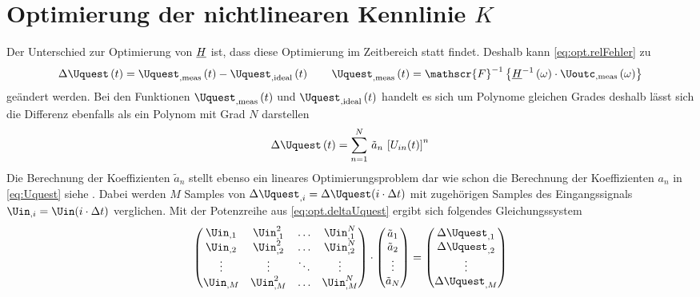 \documentclass[../Report.tex]{subfiles}
\begin{document}
\section{Optimierung der nichtlinearen Kennlinie $K$}
\label{sec:opt.K}
Der Unterschied zur Optimierung von $\underline{H}$ ist, dass diese Optimierung im Zeitbereich statt findet. Deshalb kann \eqref{eq:opt.relFehler} zu
\begin{align}
	\label{eq:opt.deltaUquest}
	\Delta \Uquest \oft = \Uquest_{, \mathrm{meas}} \oft - \Uquest_{, \mathrm{ideal}} \oft
	\qquad
	\Uquest_{, \mathrm{meas}} \oft = \mathscr{F}^{-1} \left\{ \Hcompl^{-1} \ofomega \cdot \Uoutc_{, \mathrm{meas}} \ofomega \right\}
\end{align}
geändert werden. Bei den Funktionen $\Uquest_{, \mathrm{meas}} \oft$ und $\Uquest_{, \mathrm{ideal}} \oft$ handelt es sich um Polynome gleichen Grades deshalb lässt sich die Differenz ebenfalls als ein Polynom mit Grad $N$ darstellen
\begin{align}
	\Delta \Uquest \oft = \sum_{n=1}^N \, \tilde{a}_n \, \left[ U_{in}(t) \right]^n	
\end{align}
Die Berechnung der Koeffizienten $\tilde{a}_n$ stellt ebenso ein lineares Optimierungsproblem dar wie schon die Berechnung der Koeffizienten $a_n$ in \eqref{eq:Uquest} siehe \cite{harzheim}. Dabei werden $M$ Samples von ${\Delta \Uquest_{,i} = \Delta \Uquest (i \cdot \Delta t)}$ mit zugehörigen Samples des Eingangssignals ${\Uin_{,i} = \Uin (i \cdot \Delta t)}$ verglichen. Mit der Potenzreihe aus  \eqref{eq:opt.deltaUquest} ergibt sich folgendes Gleichungssystem
\begin{align}
	\left( 
	\begin{matrix}
	 	\Uin_{,1} & \Uin_{,1}^2 & \dots & \Uin_{,1}^N \\
		\Uin_{,2} & \Uin_{,2}^2 & \dots & \Uin_{,2}^N \\
		\vdots & \vdots & \ddots & \vdots \\
		\Uin_{,M} & \Uin_{,M}^2 & \dots & \Uin_{,M}^N \\
	\end{matrix}
	\right)
	\cdot
	\left(
	\begin{matrix}
		\tilde{a}_1 \\
		\tilde{a}_2 \\
		\vdots \\
		\tilde{a}_N \\	 
	\end{matrix}
	\right) = \left( 
	\begin{matrix}
		\Delta \Uquest_{,1} \\
		\Delta \Uquest_{,2} \\
		\vdots \\
		\Delta \Uquest_{,M} \\	 
	\end{matrix}
	\right)
	\label{eq:Uquest.Gleichungssystem}
\end{align}
\end{document}
